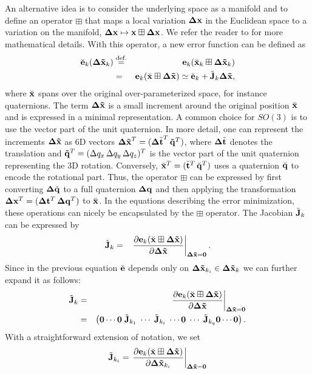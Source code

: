 \documentclass[a4paper]{article}
\begin{document}
An alternative idea is to consider the underlying space as a manifold
and to define an operator $\boxplus$ that maps a local variation
$\mathbf{\Delta x}$ in the Euclidean space to a variation on the manifold,
$\mathbf{\Delta x}\mapsto\mathbf{x}\boxplus\mathbf{\Delta x}$.  We refer the reader to
\cite[\S1.3]{hertzberg08diplom} for more mathematical details. With
this operator, a new error function can be defined as
\begin{eqnarray}
\breve {\mathbf{e}}_{k}(\mathbf{\Delta \tilde x}_k) &\stackrel{\text{def.}}{=}&
  \mathbf{e}_{k}(\breve{\mathbf{x}}_k \boxplus \mathbf{\Delta \tilde x}_k) \\
  &=& \mathbf{e}_{k}(\breve{\mathbf{x}} \boxplus \mathbf{\Delta \tilde x}) \label{eq:manifoldTaylor0}
  \simeq \breve {\mathbf{e}}_{k} + \tilde {\mathbf{J}}_{k} \mathbf{\Delta \tilde x},
\label{eq:manifoldTaylor}
\end{eqnarray}
where $\breve{\mathbf{x}}$ spans over the original over-parameterized space, for
instance quaternions. The term $\mathbf{\Delta \tilde x}$ is a small increment around
the original position $\breve{\mathbf{x}}$ and is expressed in a minimal
representation. A common choice for $SO(3)$ is to use the vector part
of the unit quaternion.
%
In more detail, one can represent the increments $\mathbf{\Delta \tilde x}$ as 6D vectors
$\mathbf{\Delta \tilde x}^T = ( {\mathbf{\Delta}\tilde{\mathbf{t}}}^T \, {\mathbf{\tilde q}}^T)$,
where $\mathbf{\Delta} \tilde {\mathbf{t}}$ denotes the translation and $\mathbf{\tilde q}^T
= ( \Delta q_x \, \Delta q_y \, \Delta q_z)^T$ is the
vector part of the unit quaternion representing the 3D rotation.  Conversely, $\breve{\mathbf{x}}^T=(
\breve {\mathbf{t}}^T \, \breve {\mathbf{q}}^T)$ uses a quaternion $\breve {\mathbf{q}}$ to
encode the rotational part.  Thus, the operator $\boxplus$ can be
expressed by first converting $\mathbf{\Delta} \tilde {\mathbf{q}}$ to a full quaternion $\mathbf{\Delta}
\mathbf{q}$ and then applying the transformation $\mathbf{\Delta} \mathbf{x} ^T = ( \mathbf{\Delta}
\mathbf{t}^T \, \mathbf{\Delta} \mathbf{q}^T)$ to $\breve{\mathbf{x}}$.  In the equations
describing the error minimization, these operations can nicely be
encapsulated by the $\boxplus$ operator.  The Jacobian $\tilde
{\mathbf{J}}_{k}$ can be expressed by
\begin{eqnarray}
\tilde {\mathbf{J}}_{k} &=& \left. \frac{\partial \mathbf{e}_{k}(\breve{\mathbf{x}} \boxplus \mathbf{\Delta \tilde x})} {\partial \mathbf{\Delta \tilde x}} \right|_{\mathbf{\Delta \tilde x}=\mathbf{0}}.
\label{eq:manifoldJacobian}
\end{eqnarray}
Since in the previous equation $\breve{\mathbf{e}}$ depends only on $\mathbf{\Delta \tilde x}_{k_i} \in \mathbf{\Delta \tilde x}_{k}$ we can further expand it as follows:
\begin{eqnarray}
\tilde {\mathbf{J}}_{k} &=&
\left.
\frac{\partial \mathbf{e}_{k}(\breve{\mathbf{x}} \boxplus \mathbf{\Delta \tilde x})} {\partial \mathbf{\Delta \tilde x}} \right|_{\mathbf{\Delta \tilde x}=\mathbf{0}}\\
&=& \left(\mathbf{0} \cdots \mathbf{0} \; \tilde {\mathbf{J}}_{k_1} \; \cdots \; \tilde {\mathbf{J}}_{k_i} \;\cdots \mathbf{0}\; \cdots\;  \tilde {\mathbf{J}}_{k_q} \mathbf{0} \cdots \mathbf{0} \right).
\label{eq:manifoldJacobianSparse}
\end{eqnarray}
With a straightforward extension of notation, we set
\begin{equation}
\tilde {\mathbf{J}}_{k_i} = \left. \frac{ \partial \mathbf{e}_{k}(\breve{\mathbf{x}} \boxplus \mathbf{\Delta \tilde x})}{\partial \mathbf{\Delta \tilde x}_{k_i}} \right|_{\mathbf{\Delta \tilde x}=\mathbf{0}}
\end{equation}
\end{document}
